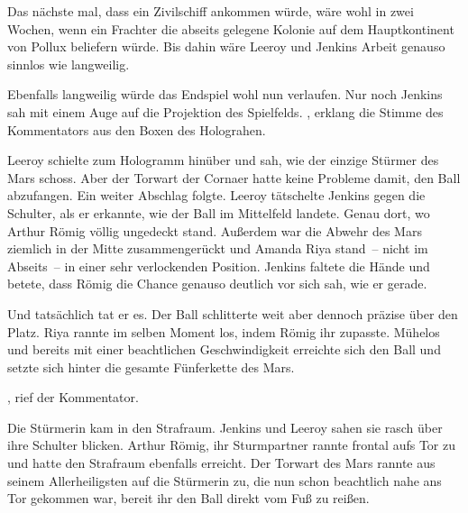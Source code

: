 \par

Das nächste mal, dass ein Zivilschiff ankommen würde, wäre wohl in zwei Wochen, wenn ein Frachter die abseits gelegene Kolonie auf dem Hauptkontinent von Pollux beliefern würde. Bis dahin wäre Leeroy und Jenkins Arbeit genauso sinnlos wie langweilig.

\par

Ebenfalls langweilig würde das Endspiel wohl nun verlaufen. Nur noch Jenkins sah mit einem Auge auf die Projektion des Spielfelds. , erklang die Stimme des Kommentators aus den Boxen des Holograhen. 

\par

Leeroy schielte zum Hologramm hinüber und sah, wie der einzige Stürmer des Mars schoss. Aber der Torwart der Cornaer hatte keine Probleme damit, den Ball abzufangen. Ein weiter Abschlag folgte. Leeroy tätschelte Jenkins gegen die Schulter, als er erkannte, wie der Ball im Mittelfeld landete. Genau dort, wo Arthur Römig völlig ungedeckt stand. Außerdem war die Abwehr des Mars ziemlich in der Mitte zusammengerückt und Amanda Riya stand~-- nicht im Abseits~-- in einer sehr verlockenden Position. Jenkins faltete die Hände und betete, dass Römig die Chance genauso deutlich vor sich sah, wie er gerade.

\par

Und tatsächlich tat er es. Der Ball schlitterte weit aber dennoch präzise über den Platz. Riya rannte im selben Moment los, indem Römig ihr zupasste. Mühelos und bereits mit einer beachtlichen Geschwindigkeit erreichte sich den Ball und setzte sich hinter die gesamte Fünferkette des Mars.

\par

, rief der Kommentator. 

\par

Die Stürmerin kam in den Strafraum. Jenkins und Leeroy sahen sie rasch über ihre Schulter blicken. Arthur Römig, ihr Sturmpartner rannte frontal aufs Tor zu und hatte den Strafraum ebenfalls erreicht. Der Torwart des Mars rannte aus seinem Allerheiligsten auf die Stürmerin zu, die nun schon beachtlich nahe ans Tor gekommen war, bereit ihr den Ball direkt vom Fuß zu reißen.

